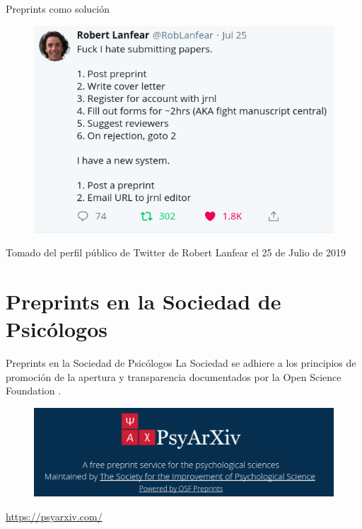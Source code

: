 \documentclass{beamer}
\begin{document}
\begin{frame}{Preprints como solución}
\begin{figure}
\centering
 \includegraphics[width=.75\textwidth]{preprint.png}
\end{figure}
 \tiny{Tomado del perfil público de Twitter de Robert Lanfear el 25 de Julio de 2019}  
\end{frame}

\section{Preprints en la Sociedad de Psicólogos}
\begin{frame}{Preprints en la Sociedad de Psicólogos}
\Large
La Sociedad se adhiere a los principios de promoción de la apertura y transparencia documentados por la Open Science Foundation \cite{Nosek2015}. 
\begin{figure}
\centering
 \includegraphics[width=1\textwidth]{Psyarxiv}
\end{figure}  
\url{https://psyarxiv.com/}
\end{frame}
\end{document}
